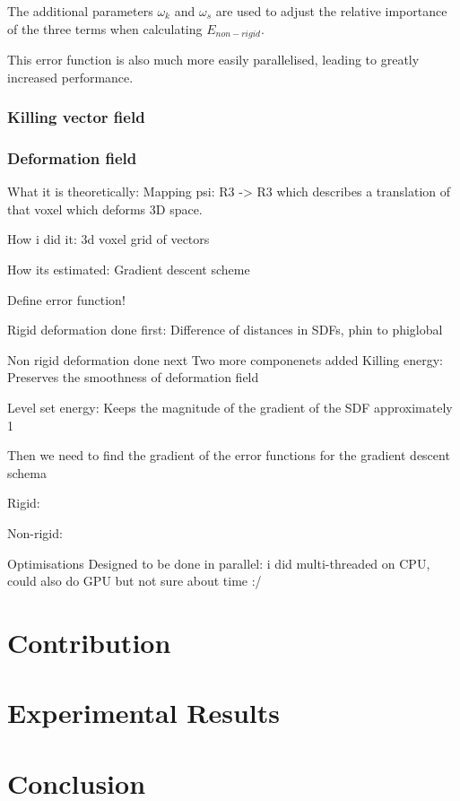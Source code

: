 \documentclass[12pt,twoside]{report}
\begin{document}
The additional parameters $\omega_k$ and $\omega_s$ are used to adjust the relative importance of the three terms when calculating $E_{non-rigid}$.

This error function is also much more easily parallelised, leading to greatly increased performance.\\


\subsection{Killing vector field}

\subsection{Deformation field}
What it is theoretically:
Mapping psi: R3 -> R3 which describes a translation of that voxel which deforms 3D space.

How i did it:
3d voxel grid of vectors

How its estimated:
Gradient descent scheme

Define error function!

Rigid deformation done first:
Difference of distances in SDFs, phin to phiglobal

Non rigid deformation done next
Two more componenets added
Killing energy:
Preserves the smoothness of deformation field

Level set energy:
Keeps the magnitude of the gradient of the SDF approximately 1

Then we need to find the gradient of the error functions for the gradient descent schema

Rigid:

Non-rigid:

Optimisations
Designed to be done in parallel: i did multi-threaded on CPU, could also do GPU but not sure about time :/


\chapter{Contribution}


\chapter{Experimental Results}


\chapter{Conclusion}



\end{document}
